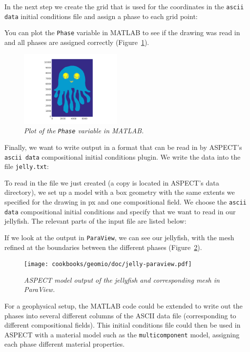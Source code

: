 \documentclass{article}
\newcommand{\aspect}{\textsc{ASPECT}}
\begin{document}
In the next step we create the grid that is used for the coordinates in the \texttt{ascii data} initial conditions file
and assign a phase to each grid point:

You can plot the \texttt{Phase} variable in MATLAB to see if the drawing was read in and all phases are assigned correctly
(Figure~\ref{fig:jelly-plot}).
\begin{figure}[tb]
    \centering
    \includegraphics[width=0.45\textwidth]{cookbooks/geomio/doc/jelly.png}
    \caption{\it Plot of the \texttt{Phase} variable in MATLAB.}
    \label{fig:jelly-plot}
\end{figure}
Finally, we want to write output in a format that can be read in by \aspect{}'s \texttt{ascii data} compositional
initial conditions plugin. We write the data into the file \texttt{jelly.txt}:


To read in the file we just created (a copy is located in \aspect{}'s data directory),
we set up a model with a box geometry with the same extents we specified for the drawing in px
and one compositional field. We choose the \texttt{ascii data} compositional initial conditions and specify that we
want to read in our jellyfish. The relevant parts of the input file are listed below:


If we look at the output in \texttt{ParaView}, we can see our jellyfish, with the mesh refined at the
boundaries between the different phases (Figure~\ref{fig:jelly-paraview}).
\begin{figure}[tb]
    \centering
    \texttt{[image: cookbooks/geomio/doc/jelly-paraview.pdf]}
    \caption{\it \aspect{} model output of the jellyfish and corresponding mesh in ParaView.}
    \label{fig:jelly-paraview}
\end{figure}

For a geophysical setup, the MATLAB code could be extended to write out the phases into several different columns
of the ASCII data file (corresponding to different compositional fields). This initial conditions file could then be
used in \aspect{} with a material model such as the \texttt{multicomponent} model, assigning each phase different
material properties.
\end{document}
